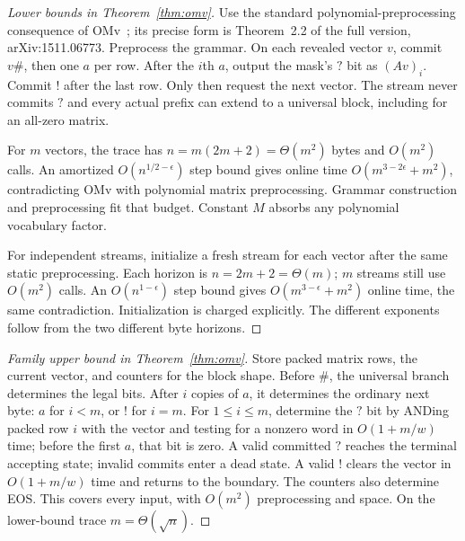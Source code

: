 \documentclass[manuscript,screen,11pt,nonacm]{acmart}
\theoremstyle{definition}\newtheorem{definition}{Definition}
\begin{document}
\begin{proof}[Lower bounds in Theorem~\ref{thm:omv}]
Use the standard polynomial-preprocessing consequence of OMv~\cite{Henzinger_2015}; its precise form is Theorem~2.2 of the full version, arXiv:1511.06773. Preprocess the grammar. On each revealed vector $v$, commit $v\#$, then one $a$ per row. After the $i$th $a$, output the mask's $?$ bit as $(Av)_i$. Commit $!$ after the last row. Only then request the next vector. The stream never commits $?$ and every actual prefix can extend to a universal block, including for an all-zero matrix.

For $m$ vectors, the trace has $n=m(2m+2)=\Theta(m^2)$ bytes and $O(m^2)$ calls. An amortized $O(n^{1/2-\epsilon})$ step bound gives online time $O(m^{3-2\epsilon}+m^2)$, contradicting OMv with polynomial matrix preprocessing. Grammar construction and preprocessing fit that budget. Constant $M$ absorbs any polynomial vocabulary factor.

For independent streams, initialize a fresh stream for each vector after the same static preprocessing. Each horizon is $n=2m+2=\Theta(m)$; $m$ streams still use $O(m^2)$ calls. An $O(n^{1-\epsilon})$ step bound gives $O(m^{3-\epsilon}+m^2)$ online time, the same contradiction. Initialization is charged explicitly. The different exponents follow from the two different byte horizons.
\end{proof}

\begin{proof}[Family upper bound in Theorem~\ref{thm:omv}]
Store packed matrix rows, the current vector, and counters for the block shape. Before $\#$, the universal branch determines the legal bits. After $i$ copies of $a$, it determines the ordinary next byte: $a$ for $i<m$, or $!$ for $i=m$. For $1\le i\le m$, determine the $?$ bit by ANDing packed row $i$ with the vector and testing for a nonzero word in $O(1+m/w)$ time; before the first $a$, that bit is zero. A valid committed $?$ reaches the terminal accepting state; invalid commits enter a dead state. A valid $!$ clears the vector in $O(1+m/w)$ time and returns to the boundary. The counters also determine EOS. This covers every input, with $O(m^2)$ preprocessing and space. On the lower-bound trace $m=\Theta(\sqrt n)$.
\end{proof}
\end{document}
